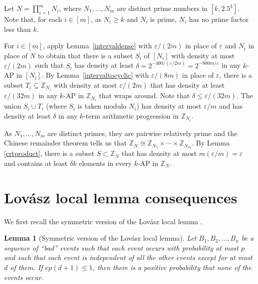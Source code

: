 \documentclass[11pt]{article}
\makeatletter
\numberwithin{equation}{section}
\renewenvironment{proof}[1][\proofname]{\par
  \vspace{-\topsep}%
  \pushQED{\qed}%
  \normalfont
  \topsep0pt \partopsep0pt %
  \trivlist
  \item[\hskip\labelsep
        \itshape
    #1\@addpunct{.}]\ignorespaces
}{%
  \popQED\endtrivlist\@endpefalse
  \addvspace{6pt plus 6pt} %
}
\newtheorem{lem}[result]{Lemma}
\theoremstyle{definition}
\theoremstyle{remark}
\makeatother
\begin{document}
\begin{proof}[Proof of Lemma~\ref{cyclicdense}]
Let $N=\prod_{i=1}^m N_i$, where $N_1,\ldots,N_m$ are distinct prime numbers in $[k,2.5^k]$. Note that, for each $i \in [m]$, as $N_i \geq k$ and $N_i$ is prime, $N_i$ has no prime factor less than $k$. 

For $i \in [m]$, apply Lemma~\ref{intervaldense} with $\varepsilon/(2m)$ in place of $\varepsilon$ and $N_i$ in place of $N$ to obtain that there is a subset $S_i$ of $[N_i]$ with density at most $\varepsilon/(2m)$ such that $S_i$ has density at least $\delta=2^{-400/(\varepsilon/2m)}=2^{-800m/\varepsilon}$ in any $k$-AP in $[N_i]$. By Lemma~\ref{intervaltocyclic} with $\varepsilon/(8m)$ in place of $\varepsilon$, there is a subset $T_i \subseteq \mathbb{Z}_{N_i}$ with density at most $\varepsilon/(2m)$ that has density at least $\varepsilon/(32m)$ in any $k$-AP in $\mathbb{Z}_{N_i}$ that wraps around. Note that $\delta \leq \varepsilon/(32m)$. The union $S_i \cup T_i$ (where $S_i$ is taken modulo $N_i$) has density at most $\varepsilon/m$ and has density at least $\delta$ in any $k$-term arithmetic progression in $\mathbb{Z}_{N_i}$.  

As $N_1,\ldots,N_m$ are distinct primes, they are pairwise relatively prime and the Chinese remainder theorem tells us that $\mathbb{Z}_N \cong  \mathbb{Z}_{N_1} \times \cdots \times \mathbb{Z}_{N_m}$. By Lemma \ref{crtproduct}, there is a subset $S \subset \mathbb{Z}_N$ that has density at most $m(\varepsilon/m)=\varepsilon$ and contains at least $\delta k$ elements in every $k$-AP in $\mathbb{Z}_N$.  
\end{proof}


\section{Lov\'asz local lemma consequences}
\label{sectionlll}

We first recall the symmetric version of the Lov\'asz local lemma \cite{Spencer77}. 

\begin{lem}[Symmetric version of the Lov\'asz local lemma] Let $B_1,B_2,\ldots,B_n$ be a sequence of ``bad'' events such that each event occurs with probability at most $p$ and such that each event is independent of all the other events except for at most $d$ of them. If $ep(d+1) \leq 1$, then there is a positive probability that none of the events occur. 
\end{lem}
\end{document}
